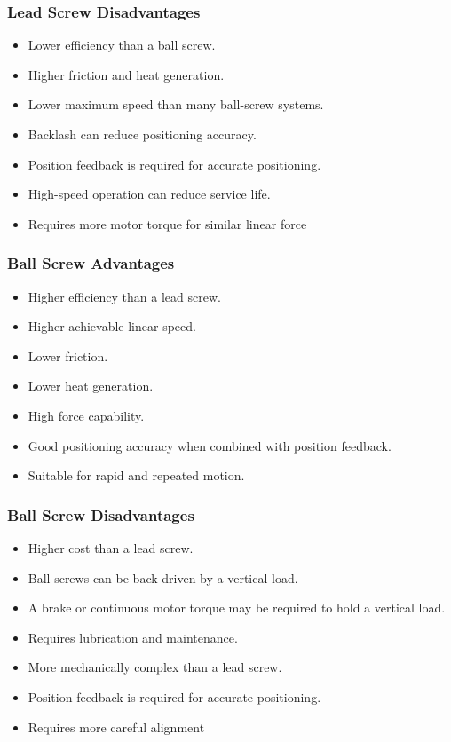 \documentclass{article}
\begin{document}
\subsubsection{Lead Screw Disadvantages}

\begin{itemize}
    \item Lower efficiency than a ball screw.
    \item Higher friction and heat generation.
    \item Lower maximum speed than many ball-screw systems.
    \item Backlash can reduce positioning accuracy.
    \item Position feedback is required for accurate positioning.
    \item High-speed operation can reduce service life.
    \item Requires more motor torque for similar linear force 
\end{itemize}


\subsubsection{Ball Screw Advantages}

\begin{itemize}
    \item Higher efficiency than a lead screw.
    \item Higher achievable linear speed.
    \item Lower friction.
    \item Lower heat generation.
    \item High force capability.
    \item Good positioning accuracy when combined with position feedback.
    \item Suitable for rapid and repeated motion.
\end{itemize}

\subsubsection{Ball Screw Disadvantages}

\begin{itemize}
    \item Higher cost than a lead screw.
    \item Ball screws can be back-driven by a vertical load.
    \item A brake or continuous motor torque may be required to hold a
    vertical load.
    \item Requires lubrication and maintenance.
    \item More mechanically complex than a lead screw.
    \item Position feedback is required for accurate positioning.
    \item Requires more careful alignment 
\end{itemize}
\end{document}
